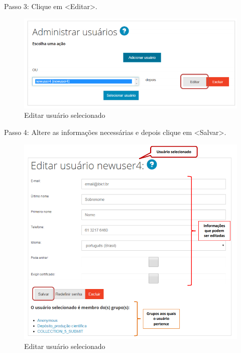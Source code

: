 \documentclass[12pt,hidelinks]{article}
\begin{document}
\newpage

    Passo 3: Clique em <Editar>.
    
    \begin{figure}[!htp]
                \centering
                \includegraphics[scale=0.8]{figura/Figura61.png}
                \caption{Editar usuário selecionado}
            \label{Rotulo}
        \end{figure}
    
    Passo 4: Altere as informações necessárias e depois clique em <Salvar>.
    
    \begin{figure}[!htp]
                \centering
                \includegraphics[scale=0.7]{figura/Figura62.png}
                \caption{Editar usuário selecionado}
            \label{Rotulo}
        \end{figure}
\end{document}
